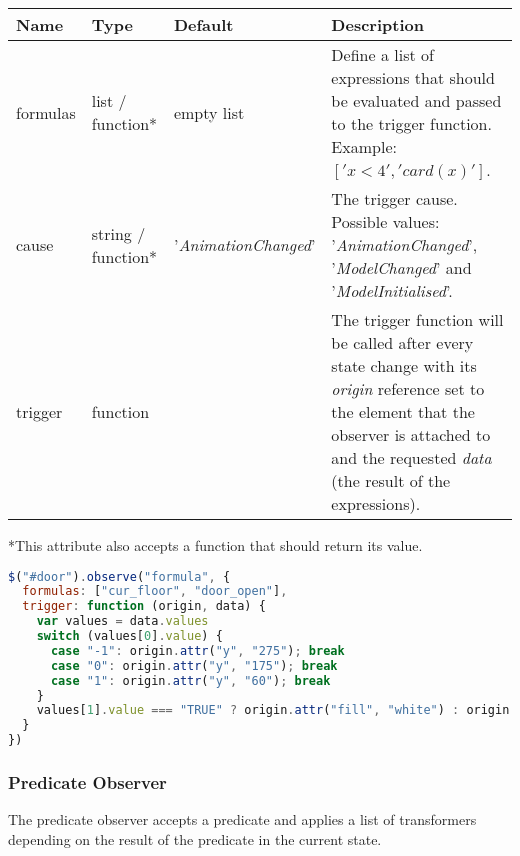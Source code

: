 \begin{tabular}{ l l l p{7cm} }
  \textbf{Name} & \textbf{Type} & \textbf{Default} & \textbf{Description} \\
  \hline\noalign{\medskip}
  formulas & list / function* & empty list & Define a list of expressions that should be evaluated and passed to the trigger function. Example: $['x < 4', 'card(x)']$.\\
  \hline\noalign{\medskip}
  cause & string / function* & '\textit{AnimationChanged}' & The trigger cause. Possible values: '\textit{AnimationChanged}', '\textit{ModelChanged}' and '\textit{ModelInitialised}'. \\
  \hline\noalign{\medskip}
  trigger & function &  & The trigger function will be called after every state change with its \textit{origin} reference set to the element that the observer is attached to and the requested \textit{data} (the result of the expressions). \\
\end{tabular}

*This attribute also accepts a function that should return its value.

\begin{lstlisting}[language=JavaScript]
$("#door").observe("formula", {
  formulas: ["cur_floor", "door_open"],
  trigger: function (origin, data) {
    var values = data.values
    switch (values[0].value) {
      case "-1": origin.attr("y", "275"); break
      case "0": origin.attr("y", "175"); break
      case "1": origin.attr("y", "60"); break
    }
    values[1].value === "TRUE" ? origin.attr("fill", "white") : origin.attr("fill", "lightgray")
  }
})
\end{lstlisting}

\subsubsection{Predicate Observer}

The predicate observer accepts a predicate and applies a list of transformers depending on the result of the predicate in the current state.

